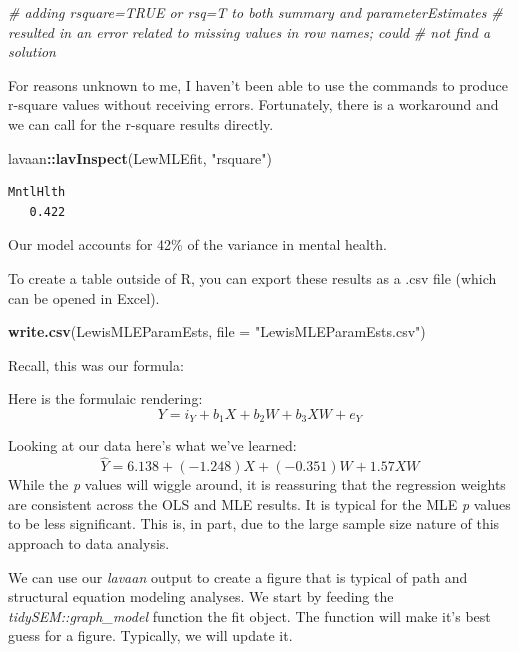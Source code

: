 \documentclass[
  11pt,
]{book}
\newenvironment{Shaded}{\begin{snugshade}}{\end{snugshade}}
\newcommand{\AttributeTok}[1]{\textcolor[rgb]{0.27,0.27,0.27}{#1}}
\newcommand{\CommentTok}[1]{\textcolor[rgb]{0.37,0.37,0.37}{\textit{#1}}}
\newcommand{\FunctionTok}[1]{\textcolor[rgb]{0.27,0.27,0.27}{\textbf{#1}}}
\newcommand{\NormalTok}[1]{#1}
\newcommand{\SpecialCharTok}[1]{\textcolor[rgb]{0.43,0.43,0.43}{\textbf{#1}}}
\newcommand{\StringTok}[1]{\textcolor[rgb]{0.5,0.5,0.5}{#1}}
\begin{document}
\begin{Shaded}
\begin{Highlighting}[]
\CommentTok{\# adding rsquare=TRUE or rsq=T to both summary and parameterEstimates}
\CommentTok{\# resulted in an error related to missing values in row names; could}
\CommentTok{\# not find a solution}
\end{Highlighting}
\end{Shaded}

For reasons unknown to me, I haven't been able to use the commands to produce r-square values without receiving errors. Fortunately, there is a workaround and we can call for the r-square results directly.

\begin{Shaded}
\begin{Highlighting}[]
\NormalTok{lavaan}\SpecialCharTok{::}\FunctionTok{lavInspect}\NormalTok{(LewMLEfit, }\StringTok{"rsquare"}\NormalTok{)}
\end{Highlighting}
\end{Shaded}

\begin{verbatim}
MntlHlth 
   0.422 
\end{verbatim}

Our model accounts for 42\% of the variance in mental health.

To create a table outside of R, you can export these results as a .csv file (which can be opened in Excel).

\begin{Shaded}
\begin{Highlighting}[]
\FunctionTok{write.csv}\NormalTok{(LewisMLEParamEsts, }\AttributeTok{file =} \StringTok{"LewisMLEParamEsts.csv"}\NormalTok{)}
\end{Highlighting}
\end{Shaded}

Recall, this was our formula:

Here is the formulaic rendering: \[Y = i_{Y}+ b_{1}X+ b_{2}W + b_{3}XW +e_{Y}\]

Looking at our data here's what we've learned: \[\hat{Y} = 6.138 + (-1.248)X + (-0.351)W + 1.57XW\] While the \emph{p} values will wiggle around, it is reassuring that the regression weights are consistent across the OLS and MLE results. It is typical for the MLE \emph{p} values to be less significant. This is, in part, due to the large sample size nature of this approach to data analysis.

We can use our \emph{lavaan} output to create a figure that is typical of path and structural equation modeling analyses. We start by feeding the \emph{tidySEM::graph\_model} function the fit object. The function will make it's best guess for a figure. Typically, we will update it.
\end{document}
